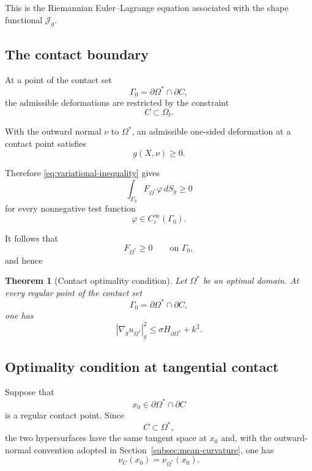 \documentclass{article}
\renewcommand{\boxed}[1]{#1}
\newtheorem{theorem}{Theorem}[section]
\begin{document}
This is the Riemannian Euler--Lagrange equation associated with the
shape functional $\mathcal J_g$.


\subsection{The contact boundary}
\label{subsec:contact-optimality}

At a point of the contact set
\[
\Gamma_0=\partial\Omega^\ast\cap\partial C,
\]
the admissible deformations are restricted by the constraint
\[
C\subset\Omega_t.
\]

With the outward normal $\nu$ to $\Omega^\ast$, an admissible
one-sided deformation at a contact point satisfies
\begin{equation}
g(X,\nu)\geq0.
\label{eq:contact-admissible-velocity}
\end{equation}

Therefore \eqref{eq:variational-inequality} gives
\[
\int_{\Gamma_0}
F_{\Omega^\ast}\varphi\,dS_g
\geq0
\]
for every nonnegative test function
\[
\varphi\in C_c^\infty(\Gamma_0).
\]

It follows that
\begin{equation}
F_{\Omega^\ast}\geq0
\qquad\text{on }\Gamma_0,
\end{equation}
and hence

\begin{theorem}[Contact optimality condition]
\label{thm:contact-optimality}
Let $\Omega^\ast$ be an optimal domain. At every regular point of the
contact set
\[
\Gamma_0=\partial\Omega^\ast\cap\partial C,
\]
one has
\begin{equation}
\boxed{
|\nabla_g u_{\Omega^\ast}|_g^2
\leq
\sigma H_{\partial\Omega^\ast}
+k^2.
}
\label{eq:contact-inequality}
\end{equation}
\end{theorem}


\subsection{Optimality condition at tangential contact}
\label{subsec:tangential-contact}

Suppose that
\[
x_0\in\partial\Omega^\ast\cap\partial C
\]
is a regular contact point. Since
\[
C\subset\Omega^\ast,
\]
the two hypersurfaces have the same tangent space at $x_0$ and,
with the outward-normal convention adopted in
Section~\ref{subsec:mean-curvature}, one has
\[
\nu_C(x_0)=\nu_{\Omega^\ast}(x_0).
\]
\end{document}
